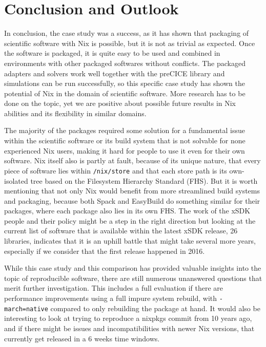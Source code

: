 \documentclass{eceasst}
\begin{document}
\section{Conclusion and Outlook}

In conclusion, the case study was a success, as it has shown that packaging of scientific software with Nix is possible, but it is not as trivial as expected.
Once the software is packaged, it is quite easy to be used and combined in environments with other packaged softwares without conflicts.
The packaged adapters and solvers work well together with the preCICE library and simulations can be run successfully, so this specific case study has shown the potential of Nix in the domain of scientific software.
More research has to be done on the topic, yet we are positive about possible future results in Nix abilities and its flexibility in similar domains.

The majority of the packages required some solution for a fundamental issue within the scientific software or its build system that is not solvable for none experienced Nix users, making it hard for people to use it even for their own software.
Nix itself also is partly at fault, because of its unique nature, that every piece of software lies within \texttt{/nix/store} and that each store path is its own-isolated tree based on the Filesystem Hierarchy Standard (FHS).
But it is worth mentioning that not only Nix would benefit from more streamlined build systems and packaging, because both Spack and EasyBuild do something similar for their packages, where each package also lies in its own FHS.
The work of the xSDK people and their policy might be a step in the right direction but looking at the current list of software that is available within the latest xSDK release, 26 libraries, indicates that it is an uphill battle that might take several more years, especially if we consider that the first release happened in 2016.

While this case study and this comparison has provided valuable insights into the topic of reproducible software, there are still numerous unanswered questions that merit further investigation.
This includes a full evaluation if there are performance improvements using a full impure system rebuild, with \texttt{-march=native} compared to only rebuilding the package at hand.
It would also be interesting to look at trying to reproduce a nixpkgs commit from 10 years ago, and if there might be issues and incompatibilities with newer Nix versions, that currently get released in a 6 weeks time windows.
\end{document}
